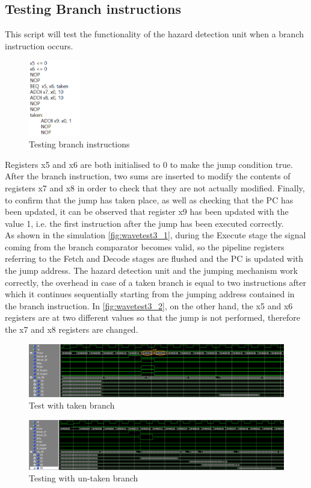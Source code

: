 \subsection{Testing Branch instructions}
This script will test the functionality of the hazard detection unit when a branch instruction occurs.
\begin{figure}[H]
	\centering
	\includegraphics[width=0.2\textwidth]{sec3/images/test3.png}
	\caption{Testing branch instructions}
	\label{fig:test3}
\end{figure}
\noindent Registers x5 and x6 are both initialised to 0 to make the jump condition true. After the branch instruction, two sums are inserted to modify the contents of registers x7 and x8 in order to check that they are not actually modified. Finally, to confirm that the jump has taken place, as well as checking that the PC has been updated, it can be observed that register x9 has been updated with the value 1, i.e. the first instruction after the jump has been executed correctly.\\
As shown in the simulation \autoref{fig:wavetest3_1}, during the Execute stage the signal coming from the branch comparator becomes valid, so the pipeline registers referring to the Fetch and Decode stages are flushed and the PC is updated with the jump address. The hazard detection unit and the jumping mechanism work correctly, the overhead in case of a taken branch is equal to two instructions after which it continues sequentially starting from the jumping address contained in the branch instruction.
In \autoref{fig:wavetest3_2}, on the other hand, the x5 and x6 registers are at two different values so that the jump is not performed, therefore the x7 and x8 registers are changed.
\begin{figure}[H]
	\centering
	\includegraphics[width=1\textwidth]{sec3/images/wave_test3_1.png}
	\caption{Test with taken branch}
	\label{fig:wavetest3_1}
\end{figure}
\begin{figure}[H]
	\centering
	\includegraphics[width=1\textwidth]{sec3/images/wave_test3_2.png}
	\caption{Testing with un-taken branch}
	\label{fig:wavetest3_2}
\end{figure}

